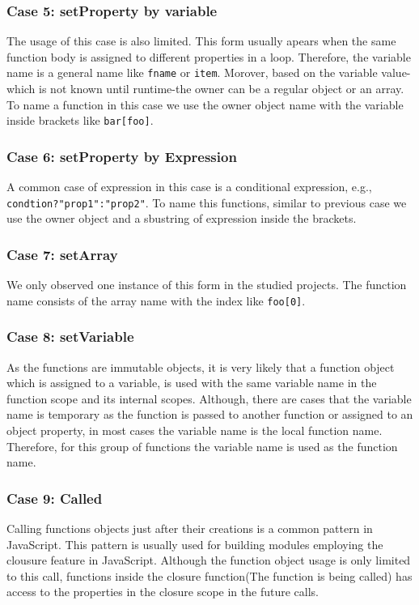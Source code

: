 \documentclass{acm_proc_article-sp}
\begin{document}
{\subsubsection{Case 5: setProperty by variable}
The usage of this case is also limited. This form usually apears when the same function body is assigned to different properties in a loop. Therefore, the variable
 name is a general name like {\small\texttt{fname}} or {\small\texttt{item}}. Morover, based on the variable value-which is not known until runtime-the owner can be a    regular object or an array. To name a function in this case we use the owner object name with the variable inside brackets like {\small\texttt{bar[foo]}}.

\subsubsection{Case 6: setProperty by Expression}
 A common case of expression in this case is a conditional expression, e.g., {\small\texttt{condtion?"prop1":"prop2"}}. To name this functions, similar to previous case we use the owner object and a sbustring of expression inside the brackets.
 

\subsubsection{Case 7: setArray}
We only observed one instance of this form in the studied projects. The function name consists of the array name with the index like {\small\texttt{foo[0]}}.

\subsubsection{Case 8: setVariable }
As the functions are immutable objects, it is very likely that a function object which is assigned to a variable, is used with the same variable name in the function scope
and its internal scopes. Although, there are cases that the variable name is temporary as the function is passed to another function or assigned to an object property, in most cases the variable name is the local function name. Therefore, for this group of functions the variable name is used as the function name.

\subsubsection{Case 9: Called}
Calling functions objects just after their creations is a common pattern in JavaScript. This pattern is usually used for building modules employing the clousure feature in JavaScript. Although the function object usage is only limited to this call, functions inside the closure function(The function is being called) has access to the properties in the closure scope in the future calls. 

}
\end{document}
